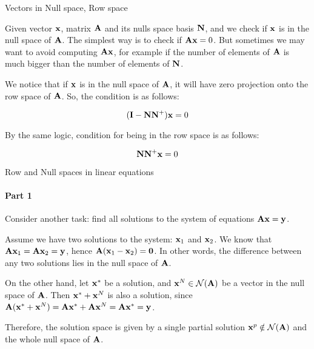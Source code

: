 \documentclass{beamer}
\begin{document}
\begin{frame}{Vectors in Null space, Row space}
\begin{flushleft}

Given vector $\mathbf{x}$, matrix $\mathbf{A}$ and its nulls space basis $\mathbf{N}$, and we check if $\mathbf{x}$ is in the null space of $\mathbf{A}$. The simplest way is to check if $\mathbf{A}\mathbf{x} = 0$. But sometimes we may want to avoid computing $\mathbf{A}\mathbf{x}$, for example if the number of elements of $\mathbf{A}$ is much bigger than the number of elements of $\mathbf{N}$.

\bigskip

We notice that if $\mathbf{x}$ is in the null space of $\mathbf{A}$, it will have zero projection onto the row space of $\mathbf{A}$. So, the condition is as follows:

\begin{equation}
    (\mathbf{I} - \mathbf{N} \mathbf{N}^+) \mathbf{x} = 0
\end{equation}

By the same logic, condition for being in the row space is as follows:

\begin{equation}
    \mathbf{N} \mathbf{N}^+ \mathbf{x} = 0
\end{equation}


\end{flushleft}
\end{frame}







\begin{frame}{Row and Null spaces in linear equations}
\framesubtitle{Part 1}
\begin{flushleft}

Consider another task: find all solutions to the system of equations $\mathbf{A} \mathbf{x} = \mathbf{y}$.

\bigskip

Assume we have two solutions to the system: $\mathbf{x}_1$ and $\mathbf{x}_2$. We know that $\mathbf{A} \mathbf{x}_1 = \mathbf{A} \mathbf{x}_2= \mathbf{y}$, hence $\mathbf{A} (\mathbf{x}_1 - \mathbf{x}_2) = \mathbf{0}$. In other words, the difference between any two solutions lies in the null space of $\mathbf{A}$.

\bigskip

On the other hand, let $\mathbf{x}^*$ be a solution, and $\mathbf{x}^N \in \mathcal{N}(\mathbf{A})$ be a vector in the null space of $\mathbf{A}$. Then $\mathbf{x}^* + \mathbf{x}^N$ is also a solution, since $\mathbf{A} (\mathbf{x}^* + \mathbf{x}^N) = \mathbf{A} \mathbf{x}^* + \mathbf{A} \mathbf{x}^N = \mathbf{A} \mathbf{x}^* = \mathbf{y}$.

\bigskip

Therefore, the solution space is given by a single partial solution $\mathbf{x}^p \notin \mathcal{N}(\mathbf{A})$ and the whole null space of $\mathbf{A}$.

\end{flushleft}
\end{frame}
\end{document}
